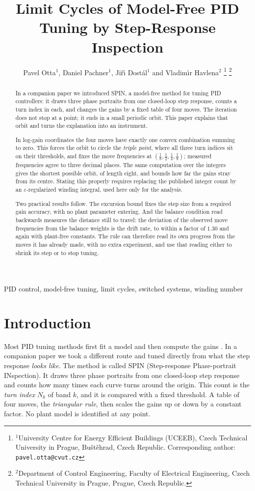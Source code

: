 \documentclass[letterpaper, 10pt, conference, twocolumn]{ieeeconf}
\title{Limit Cycles of Model-Free PID Tuning by Step-Response Inspection}
\author{Pavel Otta$^{1}$, Daniel Pachner$^{1}$, Ji\v{r}\'{\i} Dost\'al$^{1}$
and Vladim\'{\i}r Havlena$^{2}$%
\thanks{$^{1}$University Centre for Energy Efficient Buildings (UCEEB),
Czech Technical University in Prague, Bu\v{s}t\v{e}hrad, Czech Republic.
Corresponding author: \texttt{pavel.otta@cvut.cz}}%
\thanks{$^{2}$Department of Control Engineering, Faculty of Electrical
Engineering, Czech Technical University in Prague, Prague, Czech Republic.}%
}
\date{}
\begin{document}
\maketitle

\begin{abstract}
In a companion paper we introduced SPIN, a model-free method for tuning PID
controllers: it draws three phase portraits from one closed-loop step response,
counts a turn index in each, and changes the gains by a fixed table of four
moves. The iteration does not stop at a point; it ends in a small periodic
orbit. This paper explains that orbit and turns the explanation into an
instrument.

In log-gain coordinates the four moves have exactly one convex combination
summing to zero. This forces the orbit to circle the \emph{triple point}, where
all three turn indices sit on their thresholds, and fixes the move frequencies
at $(\tfrac18, \tfrac12, \tfrac14, \tfrac18)$; measured frequencies agree to
three decimal places. The same computation over the integers gives the shortest
possible orbit, of length eight, and bounds how far the gains stray from its
centre. Stating this properly requires replacing the published integer count by
an $\varepsilon$-regularized winding integral, used here only for the analysis.

Two practical results follow. The excursion bound fixes the step size from a
required gain accuracy, with no plant parameter entering. And the balance
condition read backwards measures the distance still to travel: the deviation
of the observed move frequencies from the balance weights is the drift rate, to
within a factor of $1.30$ and again with plant-free constants. The rule can
therefore read its own progress from the moves it has already made, with no
extra experiment, and use that reading either to shrink its step or to stop
tuning.
\end{abstract}

\begin{IEEEkeywords}
PID control, model-free tuning, limit cycles, switched systems,
winding number
\end{IEEEkeywords}

\section{Introduction}
\label{sec:intro}

Most PID tuning methods first fit a model and then compute the gains
\cite{ZN1942,AstromHagglund2004}. In a companion paper \cite{Paper1} we took a
different route and tuned directly from what the step response \emph{looks
like}. The method is called SPIN (Step-response Phase-portrait INspection). It
draws three phase portraits from one closed-loop step response and counts how
many times each curve turns around the origin. This count is the \emph{turn
index} $N_k$ of band $k$, and it is compared with a fixed threshold. A table of
four moves, the \emph{triangular rule}, then scales the gains up or down by a
constant factor. No plant model is identified at any point.
\end{document}
